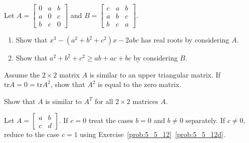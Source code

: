 \documentclass{ximera}
\begin{document}
\begin{problem}\label{prob:3x3_special_symmetric}
Let $A = \begin{bmatrix}
0 & a & b \\
a & 0 & c \\
b & c & 0	
\end{bmatrix}$ and $B =
\begin{bmatrix}
c & a & b \\
a & b & c \\
b & c & a
\end{bmatrix}$.

\begin{enumerate}
\item Show that $x^{3} - (a^{2} + b^{2} + c^{2})x - 2abc$ has real roots by considering $A$.

\item Show that $a^{2} + b^{2} + c^{2} \geq ab + ac + bc$ by considering $B$.
\end{enumerate}
\end{problem}

\begin{problem}\label{prob:2x2_special_nilpotent}
Assume the $2 \times 2$ matrix $A$ is similar to an upper triangular matrix. If $\mbox{tr} A = 0 = \mbox{tr} A^{2}$, show that $A^{2}$ is equal to the zero matrix.
\end{problem}

\begin{problem}\label{prob:2x2_similar_transpose}
Show that $A$ is similar to $A^{T}$ for all $2 \times 2$ matrices $A$. 
\begin{hint}
Let $A =\begin{bmatrix}
a & b \\
c & d
\end{bmatrix}$. If $c = 0$ treat the cases $b = 0$ and $b \neq 0$ separately. If $c \neq 0$, reduce to the case $c = 1$ using Exercise~\ref{prob:5_5_12}~\ref{prob:5_5_12d}.
\end{hint}
\end{problem}
\end{document}
